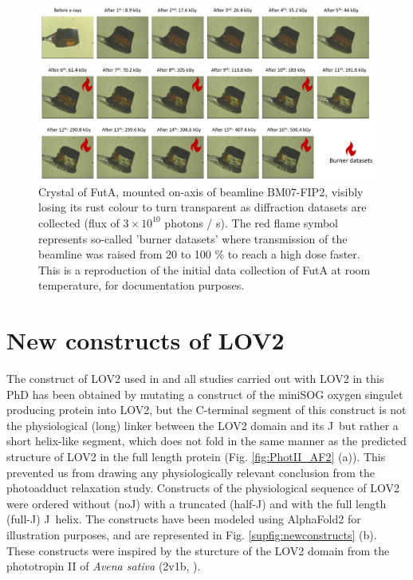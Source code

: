 \begin{figure}[H]
  \centering
  \includegraphics[width=\textwidth]{images/Spectroscopy/supp_FutA.pdf}
  \hfill
  \caption{Crystal of FutA, mounted on-axis of beamline BM07-FIP2, visibly losing its rust colour to turn transparent as diffraction datasets are collected (flux of \(3\times10^{10}\) photons / s). The red flame symbol represents so-called 'burner datasets' where transmission of the beamline was raised from 20 to 100 \% to reach a high dose faster. This is a reproduction of the initial data collection of FutA at room temperature, for documentation purposes.}\label{supfig:supfig_FutA}
\end{figure}


\section{New constructs of LOV2}\label{supchap:new_constructs}

The construct of LOV2 used in \cite{aumonierSlowProteinDynamics2022} and all studies carried out with LOV2 in this PhD has been obtained by mutating a construct of the miniSOG oxygen singulet producing protein \parencite{torraTailingMiniSOGStructural2019} into LOV2, but the C-terminal segment of this construct is not the physiological (long) linker between the LOV2 domain and its J\textalpha\, but rather a short helix-like segment, which does not fold in the same manner as the predicted structure of LOV2 in the full length protein (Fig. \ref{fig:PhotII_AF2} (a)). This prevented us from drawing any physiologically relevant conclusion from the photoadduct relaxation study. Constructs of the physiological sequence of LOV2 were ordered without (noJ\textalpha) with a truncated (half-J\textalpha) and with the full length (full-J\textalpha) J\textalpha\ helix. The constructs have been modeled using AlphaFold2 \parencite{jumperHighlyAccurateProtein2021, mirditaColabFoldMakingProtein2022} for illustration purposes, and are represented in Fig. \ref{supfig:newconstructs} (b). These constructs were inspired by the sturcture of the LOV2 domain from the phototropin II of \textit{Avena sativa} (2v1b, \cite{halavatyCTerminalFlankingRegions2007}). 

